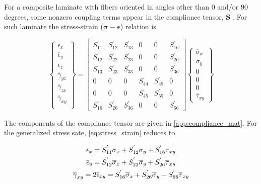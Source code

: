 \documentclass{article}
\begin{document}
For a composite laminate with fibers oriented in angles other than 0 and/or 90 degrees, some nonzero coupling terms appear in the compliance tensor, $\bm{S^{'}}$. For such laminate the stress-strain ($\bm{\sigma}-\bm{\epsilon}$) relation is \cite{Kassapoglou2015}

\begin{equation}
\begin{Bmatrix}
\overline{\epsilon}_x\\ 
\overline{\epsilon}_y\\ 
\overline{\epsilon}_z\\
\overline{\gamma}_{yz}\\ 
\overline{\gamma}_{zx}\\
\overline{\gamma}_{xy}\\
\end{Bmatrix}
=\begin{bmatrix}
S^{'}_{11} & S^{'}_{12} & S^{'}_{13} & 0 & 0 & S^{'}_{16} \\ 
S^{'}_{12} & S^{'}_{22} & S^{'}_{23} & 0 & 0 & S^{'}_{26} \\ 
S^{'}_{13} & S^{'}_{23} & S^{'}_{33} & 0 & 0 & S^{'}_{36} \\ 
0 & 0 & 0 & S^{'}_{44} & S^{'}_{45} & 0 \\ 
0 & 0 & 0 & S^{'}_{45} & S^{'}_{55} & 0 \\ 
S^{'}_{16} & S^{'}_{26} & S^{'}_{36} & 0 & 0 & S^{'}_{66}
\end{bmatrix}
\begin{Bmatrix}
\overline{\sigma}_x\\ 
\overline{\sigma}_y\\ 
0\\ 
0\\ 
0\\
\overline{\tau}_{xy}
\end{Bmatrix}
\label{eq:stress_strain}
\end{equation}

The components of the compliance tensor are given in \cref{app:compliance_mat}. For the generalized stress sate, \cref{eq:stress_strain} reduces to 

\begin{gather}
    \overline{\epsilon}_x = S^{'}_{11} \overline{\sigma}_x + S^{'}_{12} \overline{\sigma}_y + S^{'}_{16} \overline{\tau}_{xy} \notag\\
    \overline{\epsilon}_y = S^{'}_{12} \overline{\sigma}_x + S^{'}_{22} \overline{\sigma}_y + S^{'}_{26} \overline{\tau}_{xy} \notag\\
    \overline{\gamma}_{xy} = 2\overline{\epsilon}_{xy} = S^{'}_{16} \overline{\sigma}_x + S^{'}_{26} \overline{\sigma}_y + S^{'}_{66} \overline{\tau}_{xy}
    \label{eq:average_stress_strain}
\end{gather}
\end{document}
